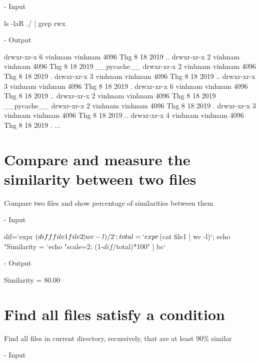 \documentclass[10pt, a4paper]{article}
\begin{document}
\noindent - Input

\begin{verbbox}
ls -laR ./ | grep rwx
\end{verbbox}

\fbox{
\theverbbox
}

\noindent - Output

\begin{verbbox}
drwxr-xr-x 6 vinhnam vinhnam 4096 Thg 8 18  2019 ..
drwxr-xr-x 2 vinhnam vinhnam 4096 Thg 8 18  2019 __pycache__
drwxr-xr-x 2 vinhnam vinhnam 4096 Thg 8 18  2019 .
drwxr-xr-x 3 vinhnam vinhnam 4096 Thg 8 18  2019 ..
drwxr-xr-x 3 vinhnam vinhnam 4096 Thg 8 18  2019 .
drwxr-xr-x 6 vinhnam vinhnam 4096 Thg 8 18  2019 ..
drwxr-xr-x 2 vinhnam vinhnam 4096 Thg 8 18  2019 __pycache__
drwxr-xr-x 2 vinhnam vinhnam 4096 Thg 8 18  2019 .
drwxr-xr-x 3 vinhnam vinhnam 4096 Thg 8 18  2019 ..
drwxr-xr-x 4 vinhnam vinhnam 4096 Thg 8 18  2019 .
...
\end{verbbox}

\fbox{
\theverbbox
}

\section{Compare and measure the similarity between two files}

Compare two files and show percentage of similarities between them

\noindent - Input

\begin{verbbox}
dif=`expr $(diff file1 file2 | wc -l) / 2`; total=`expr $(cat file1 | wc -l)`; echo "Similarity = `echo "scale=2; (1-$dif/$total)*100" | bc` %
\end{verbbox}

\fbox{
\theverbbox
}

\noindent - Output

\begin{verbbox}
Similarity = 80.00 %
\end{verbbox}

\fbox{
\theverbbox
}

\section{Find all files satisfy a condition}

Find all files in current directory, recursively, that are at least 90\% similar

\noindent - Input
\end{document}
